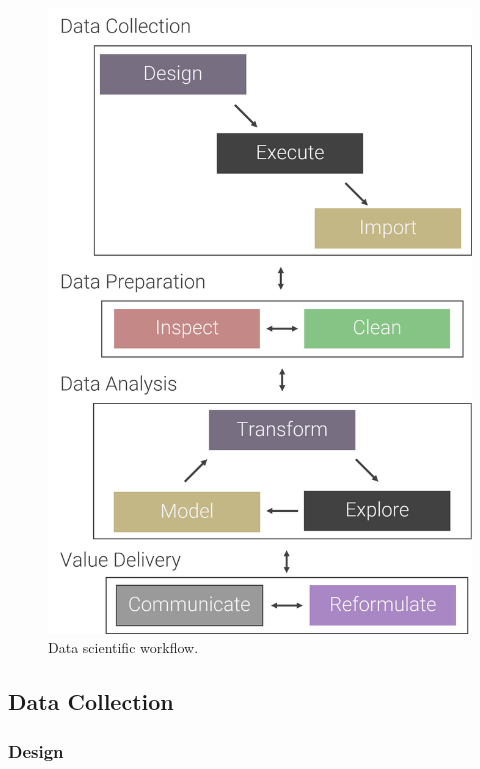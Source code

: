 \documentclass[
]{book}
\begin{document}
\begin{figure}

{\centering \includegraphics[width=17.38in]{images/data_science_workflow} 

}

\caption{Data scientific workflow.}\label{fig:ds-workflow}
\end{figure}

\hypertarget{data-collection}{%
\subsection{Data Collection}\label{data-collection}}

\hypertarget{design}{%
\subsubsection{Design}\label{design}}
\end{document}
